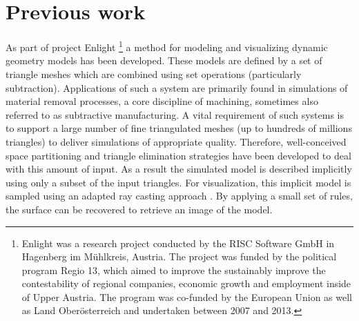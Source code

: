 
\section{Previous work}

As part of project Enlight
\footnote{
	Enlight was a research project conducted by the RISC Software GmbH in Hagenberg im M\"uhlkreis, Austria. The project was funded by the political program Regio 13, which aimed to improve the sustainably improve the contestability of regional companies, economic growth and employment inside of Upper Austria. The program was co-funded by the European Union as well as Land Ober\"osterreich and undertaken between 2007 and 2013.
}
a method for modeling and visualizing dynamic geometry models has been developed. These models are defined by a set of triangle meshes which are combined using set operations (particularly subtraction). Applications of such a system are primarily found in simulations of material removal processes, a core discipline of machining, sometimes also referred to as subtractive manufacturing. A vital requirement of such systems is to support a large number of fine triangulated meshes (up to hundreds of millions triangles) to deliver simulations of appropriate quality. Therefore, well-conceived space partitioning and triangle elimination strategies have been developed to deal with this amount of input. As a result the simulated model is described implicitly using only a subset of the input triangles. For visualization, this implicit model is sampled using an adapted ray casting approach \cite{enlight}. By applying a small set of rules, the surface can be recovered to retrieve an image of the model.
